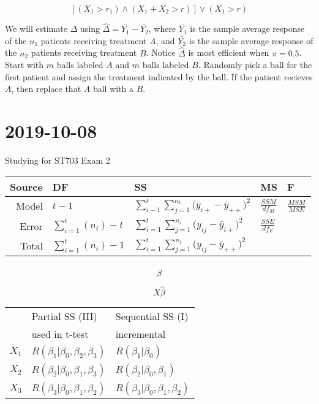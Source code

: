 \documentclass[]{article}
\begin{document}
$$
[(X_1 > r_1) \land (X_1 + X_2 > r)] \lor (X_1 > r)
$$

We will estimate $\Delta$ using $\hat{\Delta} = \bar{Y_1} - \bar{Y_2}$, where $\bar{Y_1}$ is the sample average response of the $n_1$ patients receiving treatment $A$, and $\bar{Y_2}$ is the sample average response of the $n_2$ patients receiving treatment $B$. Notice $\hat{\Delta}$ is most efficient when $\pi = 0.5 $. \\

\noindent
Start with $m$ balls labeled $A$ and $m$ balls labeled $B$. Randomly pick a ball for the first patient and assign the treatment indicated by the ball. If the patient recieves $A$, then replace that $A$ ball with a $B$.


\section*{2019-10-08}
Studying for ST703 Exam 2


\begin{table}[h]
	\begin{tabular}{r | l l  l l  }
		Source & DF & SS & MS & F  \\ \hline
		Model & $ t - 1$ & $\sum_{i-1}^{t} \sum_{j=1}^{n_1} \Big( \bar{y}_{i+} - \bar{y}_{++}  \Big)^2  $ & $\frac{SSM}{df_M}$ & $\frac{ MSM }{ MSE }$ \\
		Error & $\sum_{i = 1}^{t} (n_i) - t$ &  $\sum_{i=1}^{t} \sum_{j=1}^{n_i} \Big( y_{ij} - \bar{y}_{i+} \Big)^2 $ & $\frac{ SSE }{ df_E }$ & \\
		Total & $\sum_{i=1}^{t} (n_i) -1$ & $\sum_{i=1}^{t} \sum_{j=1}^{n_1} \Big( y_{ij} - \bar{y}_{++} \Big)^2$ & &
	\end{tabular}
\end{table}


$$\hat{\beta}$$

$$X \hat{\beta}$$



\begin{table}[H]
\begin{tabular}{r | l | l}
 & Partial SS (III)& Sequential SS (I) \\  
 & used in t-test & incremental \\	\hline
 $X_1$ & $R(\beta_1 | \beta_0, \beta_2, \beta_3)$ & $R(\beta_1  | \beta_0)$ \\
 $X_2$ & $R(\beta_2 | \beta_0, \beta_1, \beta_3)$ & $R(\beta_2  | \beta_0, \beta_1)$ \\
  $X_3$ & $R(\beta_3 | \beta_0, \beta_1, \beta_2)$ & $R(\beta_3  | \beta_0, \beta_1, \beta_2)$ \\
\end{tabular}
\end{table}
\end{document}
